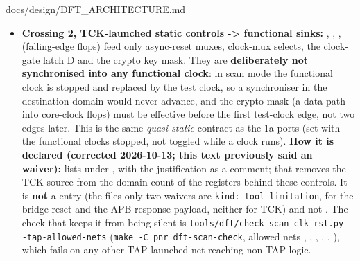 \begin{relocated}{docs/design/DFT_ARCHITECTURE.md}
\begin{itemize}
  (measured 73 -\textgreater{} 70 bit-flops on ), so a
  post-synthesis netlist is expected to show one chain, not two.
   pins each chain by hierarchy on the
  pre-merge netlist, which is why it can still tell them apart.
\item
  \textbf{Crossing 2, TCK-launched static controls -\textgreater{}
  functional sinks:} , , ,
   (falling-edge flops) feed only async-reset muxes,
  clock-mux selects, the clock-gate latch D and the crypto key mask.
  They are \textbf{deliberately not synchronised into any functional
  clock}: in scan mode the functional clock is stopped and replaced by
  the test clock, so a synchroniser in the destination domain would
  never advance, and the crypto mask (a data path into core-clock flops)
  must be effective before the first test-clock edge, not two edges
  later. This is the same \emph{quasi-static} contract as the 1a ports
  (set with the functional clocks stopped, not toggled while a clock
  runs). \textbf{How it is declared (corrected 2026-10-13; this text
  previously said an  waiver):}
   lists  under
  , with the justification as a comment; that
  removes the TCK source from the domain count of the registers behind
  these controls. It is \textbf{not} a  entry (the
  file\textquotesingle s only two waivers are
  \texttt{kind:\allowbreak{}\ tool-\allowbreak{}limitation}, for the
  bridge reset and the APB response payload, neither for TCK) and not
  . The check that keeps it from being silent is
  \texttt{tools/\allowbreak{}dft/\allowbreak{}check\_\allowbreak{}scan\_\allowbreak{}clk\_\allowbreak{}rst.\allowbreak{}py\ -\allowbreak{}-\allowbreak{}tap-\allowbreak{}allowed-\allowbreak{}nets}
  (\texttt{make\ -\allowbreak{}C\ pnr\ dft-\allowbreak{}scan-\allowbreak{}check},
  allowed nets , ,
  , , ,
  ), which fails on any other TAP-launched net reaching
  non-TAP logic.


\end{itemize}
\end{relocated}
